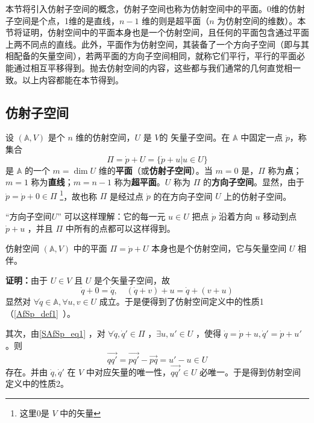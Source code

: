
\begin{issues}
\end{issues}

本节将引入仿射子空间的概念，仿射子空间也称为仿射空间中的平面。0维的仿射子空间是个点，1维的是直线，$n-1$ 维的则是超平面（$n$ 为仿射空间的维数）。本节将证明，仿射空间中的平面本身也是一个仿射空间，且任何的平面包含通过平面上两不同点的直线。此外，平面作为仿射空间，其装备了一个方向子空间（即与其相配备的矢量空间），若两平面的方向子空间相同，就称它们平行，平行的平面必能通过相互平移得到。抛去仿射空间的内容，这些都与我们通常的几何直觉相一致。以上内容都能在本节得到。
\subsection{仿射子空间}
\begin{definition}{}\label{SAfSp_def1}
设 $(\mathbb A,V)$ 是个 $n$ 维的仿射空间，$U$ 是 $V$的 矢量子空间。在 $\mathbb A$ 中固定一点 $\dot p$，称集合
\begin{equation}\label{SAfSp_eq1}
\Pi=\dot p+U=\{\dot p+u|u\in U\}
\end{equation}
是 $\mathbb A$ 的一个 $m=\dim U$ 维的\textbf{平面}（或\textbf{仿射子空间}）。当 $m=0$ 是，$\Pi$ 称为\textbf{点}；$m=1$ 称为\textbf{直线}；$m=n-1$ 称为\textbf{超平面}。$U$ 称为 $\Pi$ 的\textbf{方向子空间}。显然，由于 $\dot p=\dot p+0\in \Pi$ \footnote{这里0是 $V$ 中的矢量}，故也称 $\Pi$ 是经过点 $\dot p$ 的在方向子空间 $U$ 上的仿射子空间。
\end{definition}
“方向子空间$U$” 可以这样理解：它的每一元 $u\in U$ 把点 $\dot p$ 沿着方向 $u$ 移动到点 $\dot p+u$ ，并且 $\Pi$ 中所有的点都可以这样得到。

\begin{theorem}{}
仿射空间 $(\mathbb A,V)$ 中的平面 $\Pi=\dot p+U$ 本身也是个仿射空间，它与矢量空间 $U$ 相伴。
\end{theorem}
\textbf{证明：}由于 $U\in V$ 且 $U$ 是个矢量子空间，故
\begin{equation}
\dot q+0=\dot q,\quad (\dot q+v)+u=\dot q+(v+u)
\end{equation}
显然对 $\forall \dot q\in\mathbb A,\forall u,v\in U$ 成立。于是便得到了仿射空间定义中的性质1（\autoref{AfSp_def1}~）。

其次，由\autoref{SAfSp_eq1} ，对 $\forall \dot q,\dot q'\in\Pi$ ，$\exists u,u'\in U$ ，使得 $\dot q=\dot p+u,\dot q'=\dot p+u'$。则
\begin{equation}
\overrightarrow{qq'}=\overrightarrow{pq'}-\overrightarrow{pq}=u'-u\in U
\end{equation}
存在。并由 $\dot q,\dot q'$ 在 $V$ 中对应矢量的唯一性，$\overrightarrow{qq'}\in U$ 必唯一。于是得到仿射空间定义中的性质2。

